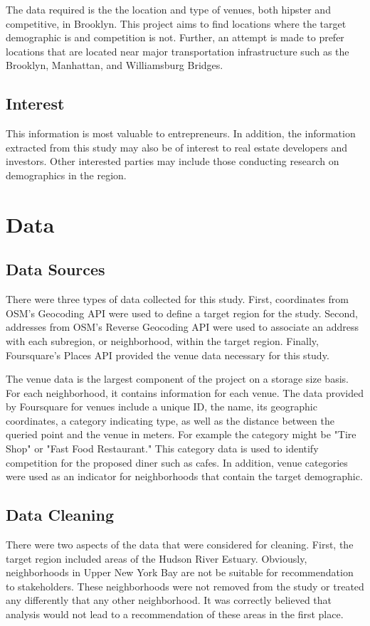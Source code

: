 \documentclass[12pt]{article}
\begin{document}
	The data required is the the location and type of venues, both hipster and competitive, in Brooklyn.
	This project aims to find locations where the target demographic is and competition is not.
	Further, an attempt is made to prefer locations that are located near major transportation infrastructure such as the Brooklyn, Manhattan, and Williamsburg Bridges.

\subsection{Interest}
	This information is most valuable to entrepreneurs. 
	In addition, the information extracted from this study may also be of interest to real estate developers and investors.
	Other interested parties may include those conducting research on demographics in the region.

\section{Data} \label{documentclasses}
\subsection{Data Sources}
	There were three types of data collected for this study.
	First, coordinates from OSM's Geocoding API were used to define a target region for the study.
	Second, addresses from OSM's Reverse Geocoding API were used to associate an address with each subregion, or neighborhood, within the target region.
	Finally, Foursquare's Places API provided the venue data necessary for this study.
	
	The venue data is the largest component of the project on a storage size basis.
	For each neighborhood, it contains information for each venue.
	The data provided by Foursquare for venues include a unique ID, the name, its geographic coordinates, a category indicating type, as well as the distance between the queried point and the venue in meters.
	For example the category might be "Tire Shop" or "Fast Food Restaurant."
	This category data is used to identify competition for the proposed diner such as cafes.
	In addition, venue categories were used as an indicator for neighborhoods that contain the target demographic.

\subsection{Data Cleaning}
	There were two aspects of the data that were considered for cleaning.
	First, the target region included areas of the Hudson River Estuary.
	Obviously, neighborhoods in Upper New York Bay are not be suitable for recommendation to stakeholders.
	These neighborhoods were not removed from the study or treated any differently that any other neighborhood.
	It was correctly believed that analysis would not lead to a recommendation of these areas in the first place.
\end{document}
